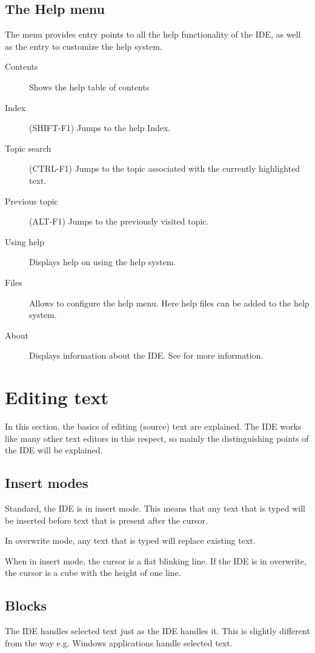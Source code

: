 \subsection{The Help menu}
\label{se:menuhelp}
The  menu provides entry points to all the help functionality of
the IDE, as well as the entry to customize the help system.
\begin{description}
\item[Contents]
Shows the help table of contents
\item[Index] (SHIFT-F1)
Jumps to the help Index.
\item[Topic search]  (CTRL-F1)
Jumps to the topic associated with the currently highlighted text.
\item[Previous topic] (ALT-F1)
Jumps to the previously visited topic.
\item[Using help]
Displays help on using the help system.
\item[Files]
Allows to configure the help menu. Here help files can be added to the help
system. 
\item[About]
Displays information about the IDE. See  for more information.
\end{description}

\section{Editing text}
\label{se:editingtext}
In this section, the basics of editing (source) text are explained. The IDE
works like many other text editors in this respect, so mainly the
distinguishing points of the IDE will be explained.

\subsection{Insert modes}
Standard, the IDE is in insert mode. This means that any text that is typed
will be inserted before text that is present after the cursor. 

In overwrite mode, any text that is typed will replace existing text. 

When in insert mode, the cursor is a flat blinking line. If the IDE is in
overwrite, the cursor is a cube with the height of one line.
%
%
\subsection{Blocks}
\label{se:blocks}
The IDE handles selected text just as the \tp IDE handles it. This is
slightly different from the way e.g. Windows applications handle selected
text. 

